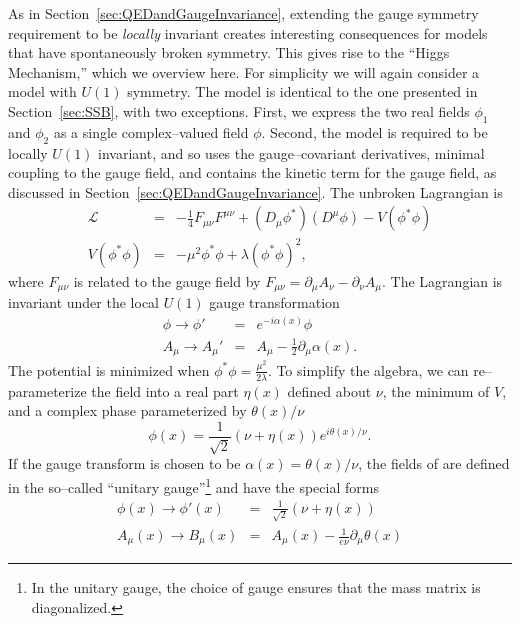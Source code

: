 As in Section~\ref{sec:QEDandGaugeInvariance}, extending the gauge symmetry
requirement to be \emph{locally} invariant creates interesting consequences for
models that have spontaneously broken symmetry.  This gives rise to the ``Higgs
Mechanism,'' which we overview here.  For simplicity we will again consider a
model with $U(1)$ symmetry.  The model is identical to the one presented in
Section~\ref{sec:SSB}, with two exceptions. First, we express the two real
fields $\phi_1$ and $\phi_2$ as a single complex--valued field $\phi$.  Second,
the model is required to be locally $U(1)$ invariant, and so uses the
gauge--covariant derivatives, minimal coupling to the gauge field, and contains
the kinetic term for the gauge field, as discussed in
Section~\ref{sec:QEDandGaugeInvariance}.  The unbroken Lagrangian is
\begin{eqnarray}
  \mathcal{L} &=& -\frac{1}{4} F_{\mu\nu}F^{\mu\nu} 
  + (D_\mu \phi^*)(D^\mu \phi) - V(\phi^*\phi) \label{eq:LocalInvariantU1} \\
  V(\phi^*\phi) &=& -\mu^2 \phi^*\phi + \lambda (\phi^*\phi)^2,
  \label{eq:PotentialLocalInvariantU1}
\end{eqnarray}
where $F_{\mu\nu}$ is related to the gauge field by $F_{\mu\nu} = \partial_\mu
A_\nu - \partial_\nu A_\mu$.  The Lagrangian is invariant under the local $U(1)$
gauge transformation
\begin{eqnarray}
  \phi \to \phi' &=& e^{-i \alpha(x)} \phi \nonumber \\
  A_\mu \to A_\mu' &=& A_\mu - \frac{1}{2} \partial_\mu \alpha(x).
  \nonumber
\end{eqnarray}
The potential is minimized when $\phi^*\phi = \frac{\mu^2}{2\lambda}$.  To
simplify the algebra, we can
re--parameterize the field into a real part $\eta(x)$ defined about $\nu$, the minimum of $V$, 
and a complex phase parameterized by $\theta(x)/\nu$
\begin{equation}
  \phi(x) = \frac{1}{\sqrt 2}(\nu + \eta(x))e^{i \theta(x)/\nu}.
  \label{eq:HiggsMechanismFieldParameterization}
\end{equation}
If the gauge transform is chosen to be $\alpha(x) = \theta(x)/\nu$, the fields
of are defined in the
so--called ``unitary gauge''\footnote{In the unitary gauge, the choice of gauge
ensures that the mass matrix is diagonalized.} and have the special forms
\begin{eqnarray}
  \phi(x) \to \phi'(x) &=& \frac{1}{\sqrt 2}(\nu + \eta(x)) \nonumber \\
  A_\mu(x) \to B_\mu(x) &=& A_\mu(x) - \frac{1}{e \nu}\partial_\mu \theta(x)
  \label{eq:AfterUnitaryGaugeTransformation}
\end{eqnarray}
